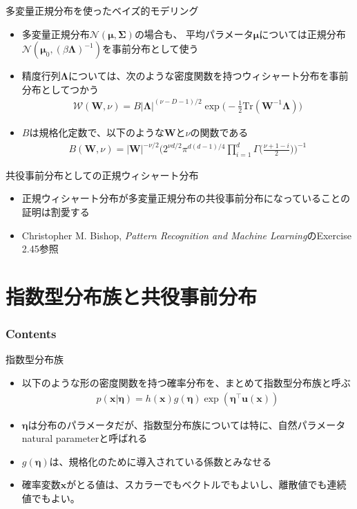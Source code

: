 \documentclass[aspectratio=169,unicode,dvipdfmx,14pt]{beamer}
\begin{document}
\begin{frame}{多変量正規分布を使ったベイズ的モデリング}
\begin{itemize}
\item 多変量正規分布$\mathcal{N}(\bm{\mu},\bm{\Sigma})$の場合も、
平均パラメータ$\bm{\mu}$については正規分布$\mathcal{N}(\bm{\mu}_0,(\beta\bm{\Lambda})^{-1})$を事前分布として使う
\item 精度行列$\bm{\Lambda}$については、次のような密度関数を持つウィシャート分布を事前分布としてつかう
\begin{align}
\mathcal{W}(\bm{W},\nu) = B|\bm{\Lambda}|^{(\nu -D-1)/2} \exp\bigg( - \frac{1}{2} \mbox{Tr}(\bm{W}^{-1}\bm{\Lambda} ) \bigg)
\end{align}
\item $B$は規格化定数で、以下のような$\bm{W}$と$\nu$の関数である
\begin{align}
B(\bm{W},\nu)=|\bm{W}|^{-\nu/2}\bigg(2^{\nu d/2}\pi^{d(d-1)/4} \prod_{i=1}^d \Gamma\Big(\frac{\nu + 1 - i}{2}\Big) \bigg)^{-1}
\end{align}
\end{itemize}
\end{frame}

\begin{frame}{共役事前分布としての正規ウィシャート分布}
\begin{itemize}
\item 正規ウィシャート分布が多変量正規分布の共役事前分布になっていることの証明は割愛する
\item Christopher M. Bishop, \textit{Pattern Recognition and Machine Learning}のExercise 2.45参照
\end{itemize}
\end{frame}

\section{指数型分布族と共役事前分布}

\begin{frame}\frametitle{Contents}
\Large \tableofcontents[currentsection]
\end{frame}

\begin{frame}{指数型分布族}
\begin{itemize}
\item 以下のような形の密度関数を持つ確率分布を、まとめて指数型分布族と呼ぶ
\begin{align}
p(\bm{x}|\bm{\eta}) = h(\bm{x}) g(\bm{\eta}) \exp(\bm{\eta}^\intercal \bm{u}(\bm{x}))
\label{eq:expfam}
\end{align}
\item $\bm{\eta}$は分布のパラメータだが、指数型分布族については特に、自然パラメータnatural parameterと呼ばれる
\item $g(\bm{\eta})$は、規格化のために導入されている係数とみなせる
\item 確率変数$\bm{x}$がとる値は、スカラーでもベクトルでもよいし、離散値でも連続値でもよい。
\end{itemize}
\end{frame}
\end{document}
